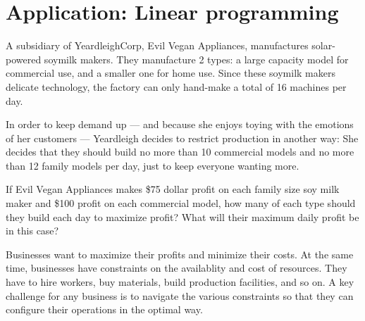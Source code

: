 
\section{Application: Linear programming}
\label{sec:linearprogramming}

\begin{boxexplore}
A subsidiary of YeardleighCorp, Evil Vegan Appliances, manufactures solar-powered soymilk makers. They manufacture 2 types: a large capacity model for commercial use, and a smaller one for home use. Since these soymilk makers delicate technology, the factory can only hand-make a total of 16 machines per day.

In order to keep demand up --- and because she enjoys toying with the emotions of her customers --- Yeardleigh decides to restrict production in another way: She decides that they should build no more than 10 commercial models and no more than 12 family models per day, just to keep everyone wanting more.

If Evil Vegan Appliances makes \$75 dollar profit on each family size soy milk maker and \$100 profit on each commercial model, how many of each type should they build each day to maximize profit? What will their maximum daily profit be in this case?
\end{boxexplore}

Businesses want to maximize their profits and minimize their costs. At the same time, businesses have constraints on the availablity and cost of resources. They have to hire workers, buy materials, build production facilities, and so on. A key challenge for any business is to navigate the various constraints so that they can configure their operations in the optimal way.

